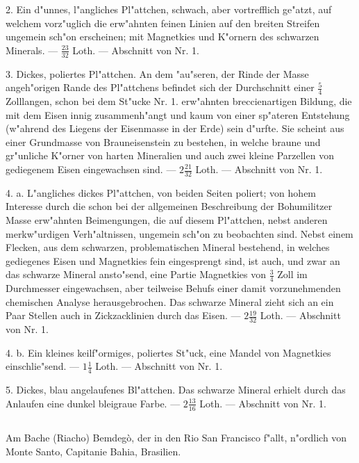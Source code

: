 \documentclass[a4paper, 11pt, oneside, polutonikogreek, german]{article}
\begin{document}
2. Ein d"unnes, l"angliches Pl"attchen, schwach, aber vortrefflich ge"atzt, auf welchem vorz"uglich die erw"ahnten feinen Linien auf den breiten Streifen ungemein sch"on erscheinen; mit Magnetkies und K"ornern des schwarzen Minerals. --- $\frac{23}{32}$ Loth. --- Abschnitt von Nr. 1.

3. Dickes, poliertes Pl"attchen. An dem "au"seren, der Rinde der Masse angeh"origen Rande des Pl"attchens befindet sich der Durchschnitt einer $\frac{5}{4}$ Zolllangen, schon bei dem St"ucke Nr. 1. erw"ahnten breccienartigen Bildung, die mit dem Eisen innig zusammenh"angt und kaum von einer sp"ateren Entstehung (w"ahrend des Liegens der Eisenmasse in der Erde) sein d"urfte. Sie scheint aus einer Grundmasse von Brauneisenstein zu bestehen, in welche braune und gr"unliche K"orner von harten Mineralien und auch zwei kleine Parzellen von gediegenem Eisen eingewachsen sind. --- $2\frac{21}{32}$ Loth. --- Abschnitt von Nr. 1.

4. a. L"angliches dickes Pl"attchen, von beiden Seiten poliert; von hohem Interesse durch die schon bei der allgemeinen Beschreibung der Bohumilitzer Masse erw"ahnten Beimengungen, die auf diesem Pl"attchen, nebst anderen merkw"urdigen Verh"altnissen, ungemein sch"on zu beobachten sind. Nebst einem Flecken, aus dem schwarzen, problematischen Mineral bestehend, in welches gediegenes Eisen und Magnetkies fein eingesprengt sind, ist auch, und zwar an das schwarze Mineral ansto"send, eine Partie Magnetkies von $\frac{3}{4}$ Zoll im Durchmesser eingewachsen, aber teilweise Behufs einer damit vorzunehmenden chemischen Analyse herausgebrochen. Das schwarze Mineral zieht sich an ein Paar Stellen auch in Zickzacklinien durch das Eisen. --- $2\frac{19}{32}$ Loth. --- Abschnitt von Nr. 1.

4. b. Ein kleines keilf"ormiges, poliertes St"uck, eine Mandel von Magnetkies einschlie"send. --- $1\frac{1}{4}$ Loth. --- Abschnitt von Nr. 1.

5. Dickes, blau angelaufenes Bl"attchen. Das schwarze Mineral erhielt durch das Anlaufen eine dunkel bleigraue Farbe. --- $2\frac{13}{16}$ Loth. --- Abschnitt von Nr. 1.
\subsection{}
\begin{center}

Am Bache (Riacho) Bemdegò, der in den Rio San Francisco f"allt, n"ordlich von Monte Santo, Capitanie Bahia, Brasilien.
\end{center}
\end{document}
